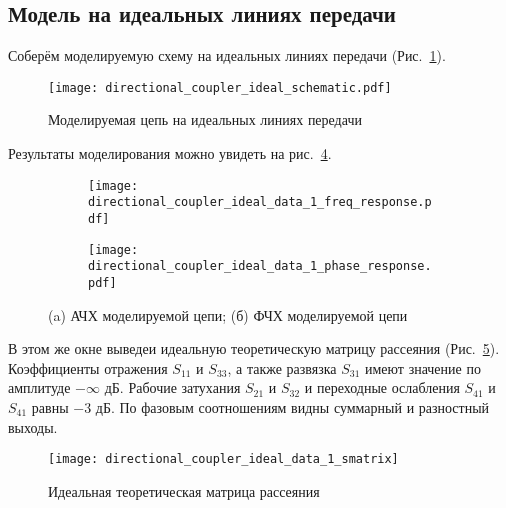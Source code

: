 \subsection{Модель на идеальных линиях передачи}

Соберём моделируемую схему на идеальных линиях передачи (Рис.~\ref{fig:directional_coupler_ideal_schematic}).

\begin{figure}[!ht]
    \centering
    \texttt{[image: directional\_coupler\_ideal\_schematic.pdf]}
    \caption{Моделируемая цепь на идеальных линиях передачи}%
    \label{fig:directional_coupler_ideal_schematic}
\end{figure}

Результаты моделирования можно увидеть на рис.~\ref{fig:directional_coupler_ideal_data_1}.

\begin{figure}[!ht]
    \centering
    \begin{subfigure}[b]{0.40\textwidth}
        \centering
        \texttt{[image: directional\_coupler\_ideal\_data\_1\_freq\_response.pdf]}
        \caption{}%
    \label{fig:directional_coupler_ideal_data_1_freq_response}
    \end{subfigure}
    \hfill
    \begin{subfigure}[b]{0.40\textwidth}
        \centering
        \texttt{[image: directional\_coupler\_ideal\_data\_1\_phase\_response.pdf]}
        \caption{}%
    \label{fig:directional_coupler_ideal_data_1_phase_response}
    \end{subfigure}
    \caption{%
        (a) АЧХ моделируемой цепи;
        (б) ФЧХ моделируемой цепи
    }%
    \label{fig:directional_coupler_ideal_data_1}
\end{figure}

В этом же окне выведеи идеальную теоретическую матрицу рассеяния (Рис.~\ref{fig:directional_coupler_ideal_data_1_smatrix}).
Коэффициенты отражения $S_{11}$ и $S_{33}$, а также развязка $S_{31}$ имеют значение по амплитуде $-\infty \text{~дБ}$. Рабочие затухания $S_{21}$ и $S_{32}$ и переходные ослабления $S_{41}$ и $S_{41}$ равны $-3 \text{~дБ}$. По фазовым соотношениям видны суммарный и разностный выходы.
\begin{figure}[!ht]
    \centering
    \texttt{[image: directional\_coupler\_ideal\_data\_1\_smatrix]}
    \caption{Идеальная теоретическая матрица рассеяния}%
    \label{fig:directional_coupler_ideal_data_1_smatrix}
\end{figure}

